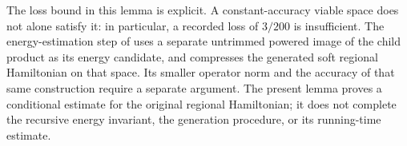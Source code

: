 The loss bound in this lemma is explicit. A constant-accuracy viable
space does not alone satisfy it: in particular, a recorded loss of
$3/200$ is insufficient. The energy-estimation step of
\cite[Figure~\texttt{fig:algo1}, lines 1631--1632, and lines
    1793--1807]{Arad2016RigorousRG} uses a separate untrimmed powered image of the child product as
its energy candidate, and compresses the generated soft regional
Hamiltonian on that space. Its smaller operator norm and the accuracy
of that same construction require a separate argument. The present
lemma proves a conditional estimate for the original regional
Hamiltonian; it does not complete the recursive energy invariant,
the generation procedure, or its running-time estimate.
